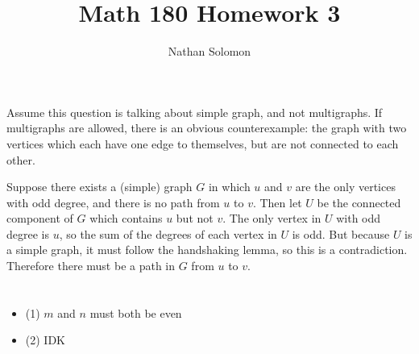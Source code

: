 \documentclass[12pt]{article}
\begin{document}
\title{Math 180 Homework 3}
\author{Nathan Solomon}
\maketitle

\section{}
\noindent{}\bigskip\par
Assume this question is talking about simple graph, and not multigraphs. If multigraphs are allowed, there is an obvious counterexample: the graph with two vertices which each have one edge to themselves, but are not connected to each other.
\par
Suppose there exists a (simple) graph $G$ in which $u$ and $v$ are the only vertices with odd degree, and there is no path from $u$ to $v$. Then let $U$ be the connected component of $G$ which contains $u$ but not $v$. The only vertex in $U$ with odd degree is $u$, so the sum of the degrees of each vertex in $U$ is odd. But because $U$ is a simple graph, it must follow the handshaking lemma, so this is a contradiction. Therefore there must be a path in $G$ from $u$ to $v$.

\section{}
\noindent{}\bigskip\par
\begin{itemize}
    \item (1) $m$ and $n$ must both be even
    \item (2) IDK
\end{itemize}
\end{document}
